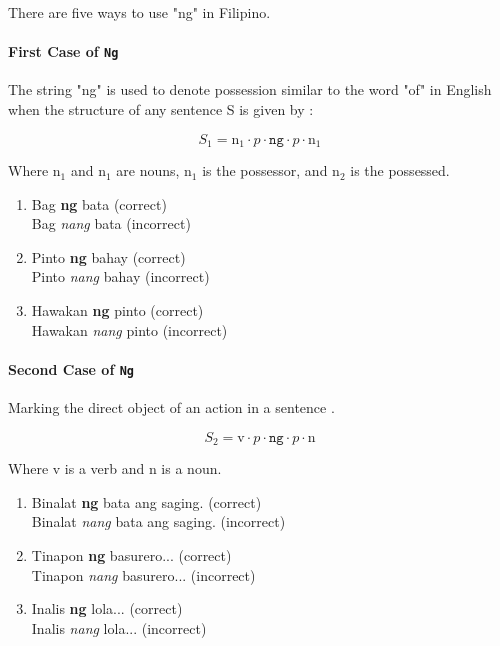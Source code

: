 \noindent There are five ways to use "ng" in Filipino.

\paragraph{First Case of \texttt{Ng}} The string "ng" is used to denote possession similar to the word "of" in English when the structure of any sentence S is given by \cite{KWF}:

\[
      S_1 = \text{n}_1 \cdot p \cdot \texttt{ng} \cdot p \cdot \text{n}_1
\]

Where n$_1$ and n$_1$ are nouns,  n$_1$ is the possessor, and n$_2$ is the possessed.

\begin{example}
\end{example}

\begin{enumerate}
      \item Bag \textbf{ng} bata (correct)
            \\ Bag \textit{nang} bata (incorrect)
      \item Pinto \textbf{ng} bahay (correct)
            \\ Pinto \textit{nang} bahay (incorrect)
      \item Hawakan \textbf{ng} pinto (correct)
            \\ Hawakan \textit{nang} pinto (incorrect)
\end{enumerate}

\paragraph{Second Case of \texttt{Ng}} Marking the direct object of an action in a sentence \cite{KWF}.

\[
      S_2 = \text{v} \cdot p \cdot \texttt{ng} \cdot p \cdot \text{n}
\]

Where v is a verb and n is a noun.

\begin{example}
\end{example}

\begin{enumerate}
      \item Binalat \textbf{ng} bata ang saging. (correct)
            \\ Binalat \textit{nang} bata ang saging. (incorrect)
      \item Tinapon \textbf{ng} basurero... (correct)
            \\ Tinapon \textit{nang} basurero... (incorrect)
      \item Inalis \textbf{ng} lola... (correct)
            \\ Inalis \textit{nang} lola... (incorrect)
\end{enumerate}

